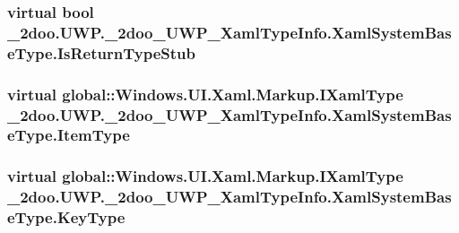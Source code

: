 \hypertarget{class__2doo_1_1_u_w_p_1_1__2doo___u_w_p___xaml_type_info_1_1_xaml_system_base_type_95934e7f0bd1fbe45f6503209346143a}{
\subsubsection[{IsReturnTypeStub}]{\setlength{\rightskip}{0pt plus 5cm}virtual bool \_\-2doo.UWP.\_\-2doo\_\-UWP\_\-XamlTypeInfo.XamlSystemBaseType.IsReturnTypeStub}}
\label{class__2doo_1_1_u_w_p_1_1__2doo___u_w_p___xaml_type_info_1_1_xaml_system_base_type_95934e7f0bd1fbe45f6503209346143a}


\hypertarget{class__2doo_1_1_u_w_p_1_1__2doo___u_w_p___xaml_type_info_1_1_xaml_system_base_type_9ec3011f6ceb3ef8baf476b9f7615c6b}{
\subsubsection[{ItemType}]{\setlength{\rightskip}{0pt plus 5cm}virtual global::Windows.UI.Xaml.Markup.IXamlType \_\-2doo.UWP.\_\-2doo\_\-UWP\_\-XamlTypeInfo.XamlSystemBaseType.ItemType}}
\label{class__2doo_1_1_u_w_p_1_1__2doo___u_w_p___xaml_type_info_1_1_xaml_system_base_type_9ec3011f6ceb3ef8baf476b9f7615c6b}


\hypertarget{class__2doo_1_1_u_w_p_1_1__2doo___u_w_p___xaml_type_info_1_1_xaml_system_base_type_df7ebec850ce55ce59c1ee92b89555c9}{
\subsubsection[{KeyType}]{\setlength{\rightskip}{0pt plus 5cm}virtual global::Windows.UI.Xaml.Markup.IXamlType \_\-2doo.UWP.\_\-2doo\_\-UWP\_\-XamlTypeInfo.XamlSystemBaseType.KeyType}}
\label{class__2doo_1_1_u_w_p_1_1__2doo___u_w_p___xaml_type_info_1_1_xaml_system_base_type_df7ebec850ce55ce59c1ee92b89555c9}


